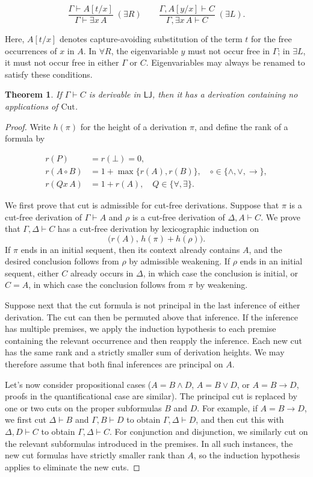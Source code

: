 \documentclass{article}
\newtheorem*{theorem}{Theorem}
\begin{document}
\[
\frac{\Gamma\vdash A[t/x]}
     {\Gamma\vdash\exists x\,A}\;(\exists R)
\qquad
\frac{\Gamma,A[y/x]\vdash C}
     {\Gamma,\exists x\,A\vdash C}\;(\exists L).
\]

Here, $A[t/x]$ denotes capture-avoiding substitution of the term $t$ for the free occurrences of $x$ in $A$. In $\forall R$, the eigenvariable $y$ must not occur free in $\Gamma$; in $\exists L$, it must not occur free in either $\Gamma$ or $C$. Eigenvariables may always be renamed to satisfy these conditions.

\begin{theorem}
If $\Gamma\vdash C$ is derivable in $\mathsf{LJ}$, then it has a derivation containing no applications of $\mathrm{Cut}$.
\end{theorem}

\begin{proof}
Write $h(\pi)$ for the height of a derivation $\pi$, and define the rank of a formula by

\[
\begin{aligned}
r(P)&=r(\bot)=0,\\
r(A\circ B)&=1+\max\{r(A),r(B)\},
  \quad\circ\in\{\land,\lor,\to\},\\
r(Qx\,A)&=1+r(A),
  \quad Q\in\{\forall,\exists\}.
\end{aligned}
\]

We first prove that cut is admissible for cut-free derivations. Suppose that $\pi$ is a cut-free derivation of 
$\Gamma\vdash A$ and $\rho$ is a cut-free derivation of $\Delta,A\vdash C$. We prove that 
$\Gamma,\Delta\vdash C$ has a cut-free derivation by lexicographic induction on
\[
\bigl(r(A),\,h(\pi)+h(\rho)\bigr).
\]
If $\pi$ ends in an initial sequent, then its context already contains $A$, and the desired conclusion follows 
from $\rho$ by admissible weakening. If $\rho$ ends in an initial sequent, either $C$ already occurs in $\Delta$, 
in which case the conclusion is initial, or $C=A$, in which case the conclusion follows from $\pi$ by weakening.

Suppose next that the cut formula is not principal in the last inference of either derivation. The cut can then be 
permuted above that inference. If the inference has multiple premises, we apply the induction hypothesis to each 
premise containing the relevant occurrence and then reapply the inference. Each new cut has the same rank and a 
strictly smaller sum of derivation heights. We may therefore assume that both final inferences are principal on $A$.

Let's now consider propositional cases ($A=B\land D$, $A=B\lor D$, or $A=B\to D$, proofs in the quantificational 
case are similar).
The principal cut is replaced by one or two cuts on the proper subformulas $B$ and $D$. For example, if $A=B\to D$, we 
first cut $\Delta\vdash B$ and $\Gamma,B\vdash D$ to obtain $\Gamma,\Delta\vdash D$, and then cut this 
with $\Delta,D\vdash C$ to obtain $\Gamma,\Delta\vdash C$. For conjunction and disjunction, we similarly cut on the 
relevant subformulas introduced in the premises. In all such instances, the new cut formulas have strictly smaller
rank than $A$, so the induction hypothesis applies to eliminate the new cuts.


\end{proof}
\end{document}
